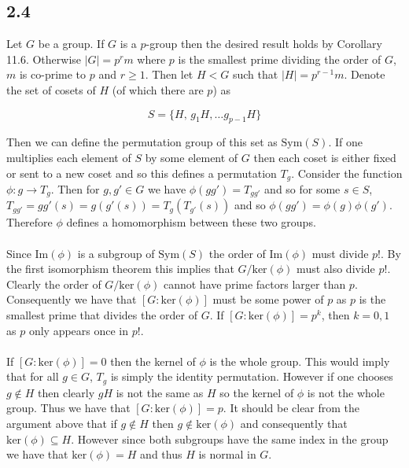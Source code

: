 \documentclass{article}
\begin{document}
\subsection*{2.4}
Let $G$ be a group. If $G$ is a $p$-group then the desired result holds by Corollary 11.6. Otherwise 
$|G| = p^rm$ where $p$ is the smallest prime dividing the order of $G$, $m$ is co-prime to $p$ and $r \geq 1$. 
Then let $H < G$ such that $|H| = p^{r-1}m$. Denote the set of cosets of $H$ (of which there are $p$) as 

\begin{equation*}
    S = \{H,\,g_1H,\dots g_{p-1}H\}
\end{equation*}

Then we can define the permutation group of this set as $\text{Sym}(S)$. If one multiplies each element of 
$S$ by some element of $G$ then each coset is either fixed or sent to a new coset and so this 
defines a permutation $T_g$. Consider the function $\phi:g\rightarrow T_g$. Then for $g,g' \in G$ 
we have $\phi(gg') = T_{gg'}$ and so for some $s \in S$, $T_{gg'} = gg'(s) = g(g'(s)) = T_g(T_{g'}(s))$ 
and so $\phi(gg') = \phi(g)\phi(g')$. Therefore $\phi$ defines a homomorphism between these two 
groups. 

\paragraph{}
Since $\text{Im}(\phi)$ is a subgroup of $\text{Sym}(S)$ the order of $\text{Im}(\phi)$ must divide 
$p!$. By the first isomorphism theorem this implies that $G/\text{ker}(\phi)$ must also divide 
$p!$. Clearly the order of $G/\text{ker}(\phi)$ cannot have prime factors larger than $p$. Consequently 
we have that $[G:\text{ker}(\phi)]$ must be some power of $p$ as $p$ is the smallest prime that 
divides the order of $G$. If $[G:\text{ker}(\phi)] = p^k$, then $k = 0,1$ as $p$ only appears once 
in $p!$.

\paragraph{}
If $[G:\text{ker}(\phi)] = 0$ then the kernel of $\phi$ is the whole group. This would imply that 
for all $g \in G$, $T_g$ is simply the identity permutation. However if one chooses $g \notin H$ 
then clearly $gH$ is not the same as $H$ so the kernel of $\phi$ is not the whole group. Thus 
we have that $[G:\text{ker}(\phi)] = p$. It should be clear from the argument above that if $g \notin H$ 
then $g \notin \text{ker}(\phi)$ and consequently that $\text{ker}(\phi) \subseteq H$. However 
since both subgroups have the same index in the group we have that $\text{ker}(\phi) = H$ and 
thus $H$ is normal in $G$.
\end{document}
